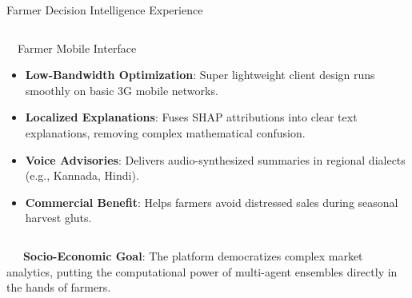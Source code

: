 \documentclass{beamer}
\begin{document}
\begin{frame}{Farmer Decision Intelligence Experience}
\begin{columns}[T]
    \begin{column}{0.48\textwidth}
        \begin{successcard}[height=5.2cm]{~~Farmer Mobile Interface}
            \fontsize{6.8pt}{8.2pt}\selectfont
            \begin{itemize}\setlength\itemsep{4.5pt}\setlength\parskip{0pt}
                \item \textbf{Low-Bandwidth Optimization}: Super lightweight client design runs smoothly on basic 3G mobile networks.
                \item \textbf{Localized Explanations}: Fuses SHAP attributions into clear text explanations, removing complex mathematical confusion.
                \item \textbf{Voice Advisories}: Delivers audio-synthesized summaries in regional dialects (e.g., Kannada, Hindi).
                \item \textbf{Commercial Benefit}: Helps farmers avoid distressed sales during seasonal harvest gluts.
            \end{itemize}
        \end{successcard}
    \end{column}
\end{columns}

\vspace{0.15cm}
\begin{tcolorbox}[enhanced, colback=primaryblue!4, colframe=primaryblue!30, boxrule=0.35pt,
  arc=3.5pt, width=0.98\textwidth, left=4pt, right=4pt, top=2.5pt, bottom=2.5pt, boxsep=0pt,
  halign=center, shadow={0.5pt}{-0.5pt}{0pt}{black!8}]
    \fontsize{5.5pt}{6.5pt}\selectfont
    \textcolor{primaryDark}{~~~\textbf{Socio-Economic Goal}: The platform democratizes complex market analytics, putting the computational power of multi-agent ensembles directly in the hands of farmers.}
\end{tcolorbox}
\end{frame}
\end{document}
